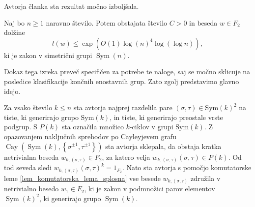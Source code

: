 Avtorja članka \cite{Kozma_Thom_2016} sta rezultat močno izboljšala.
\begin{izrek}\label{izr_kozma_thom_glavni}
    Naj bo $n \ge 1$ naravno število. Potem obstajata število $C > 0$ in beseda $w \in F_2$ dolžine 
    \begin{equation*}
        l(w)  \le \exp(O(1) \log(n)^4 \log (\log n)),
    \end{equation*}
    ki je zakon v simetrični grupi $\operatorname{Sym}(n)$. 
\end{izrek}

Dokaz tega izreka preveč specifičen za potrebe te naloge, saj se močno sklicuje na posledice klasifikacije končnih enostavnih grup. Zato zgolj predstavimo glavno idejo. 

Za vsako število $k \le n$ sta avtorja najprej razdelila pare $(\sigma, \tau) \in \text{Sym}(k)^2$ na tiste,
ki generirajo grupo $\text{Sym}(k)$, in tiste, ki generirajo preostale vrste podgrup. S $P(k)$ sta označila množico $k$-ciklov v grupi $\text{Sym}(k)$. Z opazovanjem naključnih sprehodov po Cayleyjevem grafu $\operatorname{Cay}(\operatorname{Sym}(k), \left\{ \sigma^{\pm 1}, \tau^{\pm 1} \right\} )$ sta avtorja sklepala, da obstaja kratka netrivialna beseda $w_{k, (\sigma, \tau)} \in F_2$, za katero velja
$w_{k, (\sigma, \tau)}(\sigma, \tau) \in P(k)$. Od tod seveda sledi $w_{k, (\sigma, \tau)}(\sigma, \tau)^k = 1_{F_2}$. Nato sta avtorja s pomočjo komutatorske leme \ref{lem_komutatorska_lema_splosna} vse besede $w_{k, (\sigma, \tau)}$ združila v netrivialno besedo $w_1 \in F_2$, ki je zakon v podmnožici parov elementov $\operatorname{Sym}(k)^2$,
ki generirajo grupo $\operatorname{Sym}(k)$.


